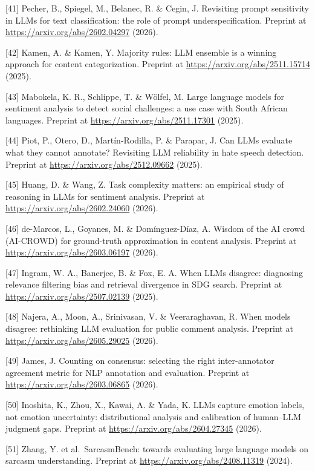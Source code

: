 \documentclass[11pt]{article}
\begin{document}
{[}41{]} Pecher, B., Spiegel, M., Belanec, R. \& Cegin, J. Revisiting
prompt sensitivity in LLMs for text classification: the role of prompt
underspecification. Preprint at \url{https://arxiv.org/abs/2602.04297} (2026).

{[}42{]} Kamen, A. \& Kamen, Y. Majority rules: LLM ensemble is a
winning approach for content categorization. Preprint at
\url{https://arxiv.org/abs/2511.15714} (2025).

{[}43{]} Mabokela, K. R., Schlippe, T. \& Wölfel, M. Large language
models for sentiment analysis to detect social challenges: a use case
with South African languages. Preprint at
\url{https://arxiv.org/abs/2511.17301} (2025).

{[}44{]} Piot, P., Otero, D., Martín-Rodilla, P. \& Parapar, J. Can LLMs
evaluate what they cannot annotate? Revisiting LLM reliability in hate
speech detection. Preprint at \url{https://arxiv.org/abs/2512.09662} (2025).

{[}45{]} Huang, D. \& Wang, Z. Task complexity matters: an empirical
study of reasoning in LLMs for sentiment analysis. Preprint at
\url{https://arxiv.org/abs/2602.24060} (2026).

{[}46{]} de-Marcos, L., Goyanes, M. \& Domínguez-Díaz, A. Wisdom of the
AI crowd (AI-CROWD) for ground-truth approximation in content analysis.
Preprint at \url{https://arxiv.org/abs/2603.06197} (2026).

{[}47{]} Ingram, W. A., Banerjee, B. \& Fox, E. A. When LLMs disagree:
diagnosing relevance filtering bias and retrieval divergence in SDG
search. Preprint at \url{https://arxiv.org/abs/2507.02139} (2025).

{[}48{]} Najera, A., Moon, A., Srinivasan, V. \& Veeraraghavan, R. When
models disagree: rethinking LLM evaluation for public comment analysis.
Preprint at \url{https://arxiv.org/abs/2605.29025} (2026).

{[}49{]} James, J. Counting on consensus: selecting the right
inter-annotator agreement metric for NLP annotation and evaluation.
Preprint at \url{https://arxiv.org/abs/2603.06865} (2026).

{[}50{]} Inoshita, K., Zhou, X., Kawai, A. \& Yada, K. LLMs capture
emotion labels, not emotion uncertainty: distributional analysis and
calibration of human--LLM judgment gaps. Preprint at
\url{https://arxiv.org/abs/2604.27345} (2026).

{[}51{]} Zhang, Y. et al.~SarcasmBench: towards evaluating large
language models on sarcasm understanding. Preprint at
\url{https://arxiv.org/abs/2408.11319} (2024).
\end{document}
